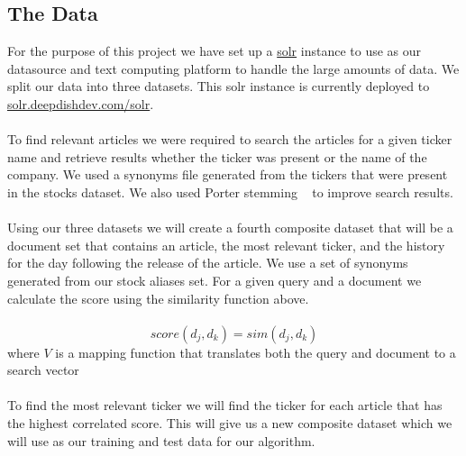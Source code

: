 \documentclass[11pt,letterpaper]{article}
\newcommand{\blue}[1]{\textcolor{RoyalBlue}{#1}}
\newcommand{\instructions}[1]{\blue{\textit{#1}}}
\begin{document}
\subsection{The Data}
\label{sec:data}
For the purpose of this project we have set up a \href{http://lucene.apache.org/solr/}{solr}
instance to use as our datasource and text computing platform to
handle the large amounts of data. We split our data into three datasets.
This solr instance is currently deployed to \href{http://solr.deepdishdev.com:8983/solr}{solr.deepdishdev.com/solr}. \\ \\
To find relevant articles we were required to search the articles
for a given ticker name and retrieve results whether the ticker
was present or the name of the company. We used a synonyms file generated
from the tickers that were present in the stocks dataset. We also used Porter
stemming ~\cite{porter} to improve search results. \\ \\
Using our three datasets we will create a fourth composite dataset that will
be a document set that contains an article, the most relevant ticker, and
the history for the day following the release of the article. We use a
set of synonyms generated from our stock aliases set.
For a given query and a document we calculate the score using the
similarity function above. \\ \\
\begin{equation}\label{doc:score}
  	score(d_j, d_k) = sim(d_j, d_k)
\end{equation}
where \(V\) is a mapping function that translates both the query and
document to a search vector \\ \\
To find the most relevant ticker we will find the ticker for each
article that has the highest correlated score.  This will give us a new
composite dataset which we will use as our training and test data for our algorithm.
\end{document}
